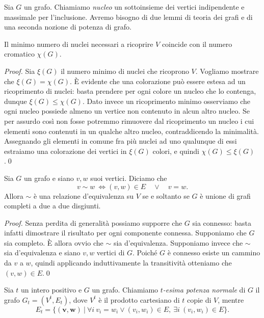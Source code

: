 Sia \(G\) un grafo. Chiamiamo \emph{nucleo} un sottoinsieme dei vertici indipendente e massimale per l'inclusione. Avremo bisogno di due lemmi di teoria dei grafi e di una seconda nozione di potenza di grafo. 
\begin{lemma}
  \label{minkernellemma} Il minimo numero di nuclei necessari a ricoprire \(V\) coincide con il numero cromatico \(\chi(G)\). 
\end{lemma}
\begin{proof}
  Sia \(\xi(G)\) il numero minimo di nuclei che ricoprono \(V\). Vogliamo mostrare che \(\xi(G)=\chi(G)\). È evidente che una colorazione può essere estesa ad un ricoprimento di nuclei: basta prendere per ogni colore un nucleo che lo contenga, dunque \(\xi(G)\le \chi(G)\). Dato invece un ricoprimento minimo osserviamo che ogni nucleo possiede almeno un vertice non contenuto in alcun altro nucleo. Se per assurdo così non fosse potremmo rimuovere dal ricoprimento un nucleo i cui elementi sono contenuti in un qualche altro nucleo, contraddicendo la minimalità. Assegnando gli elementi in comune fra più nuclei ad uno qualunque di essi estraiamo una colorazione dei vertici in \(\xi(G)\) colori, e quindi \(\chi(G)\le \xi(G)\).\qed 
\end{proof}
\begin{lemma}
  \label{releqlemma} Sia \(G\) un grafo e siano \(v,w\) suoi vertici. Diciamo che
  \[v\sim w\ \iff (v,w)\in E\quad\vee\quad v=w.\]
  Allora \(\sim\) è una relazione d'equivalenza su \(V\) se e soltanto se \(G\) è unione di grafi completi a due a due disgiunti. 
\end{lemma}
\begin{proof}
  Senza perdita di generalità possiamo supporre che \(G\) sia connesso: basta infatti dimostrare il risultato per ogni componente connessa. Supponiamo che \(G\) sia completo. \`E allora ovvio che \(\sim\) sia d'equivalenza. Supponiamo invece che \(\sim\) sia d'equivalenza e siano \(v,w\) vertici di \(G\). Poiché \(G\) è connesso esiste un cammino da \(v\) a \(w\), quindi applicando induttivamente la transitività otteniamo che \((v,w)\in E\).\qed 
\end{proof}
\begin{definition}
  Sia \(t\) un intero positivo e \(G\) un grafo. Chiamiamo \emph{\(t\)-esima potenza normale} di \(G\) il grafo \(G_t=(V^t, E_t)\), dove \(V^t\) è il prodotto cartesiano di \(t\) copie di \(V\), mentre
  \[E_t=\{(\mathbf{v},\mathbf{w})\ \vert\ \forall i\ v_i = w_i\vee (v_i, w_i)\in E,\ \exists i\ (v_i,w_i)\in E\}.\]
\end{definition}

